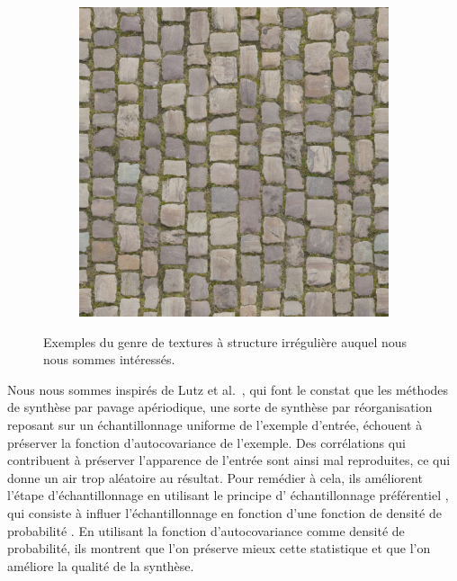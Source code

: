 \begin{figure}
\begin{subfigure}{.3\textwidth}
    \end{subfigure}
    \hfill
    \begin{subfigure}{.3\textwidth}
        \centering
        \includegraphics[width=\textwidth]{contenu/resources/images/texture_3}
    \end{subfigure}

    \caption{Exemples du genre de textures à structure irrégulière auquel nous nous sommes intéressés.}
    \label{fig:typical-textures}
\end{figure}


Nous nous sommes inspirés de Lutz et al.~\cite{lutz_preserving_2023}, qui font le constat que les méthodes de synthèse par pavage apériodique, une sorte de synthèse par réorganisation reposant sur un échantillonnage uniforme de l'exemple d'entrée, échouent à préserver la fonction d'autocovariance de l'exemple. Des corrélations qui contribuent à préserver l'apparence de l'entrée sont ainsi mal reproduites, ce qui donne un air trop aléatoire au résultat. Pour remédier à cela, ils améliorent l'étape d'échantillonnage en utilisant le principe d' \og échantillonnage préférentiel \fg{}, qui consiste à influer l'échantillonnage en fonction d'une \og fonction de densité de probabilité \fg{}. En utilisant la fonction d'autocovariance comme densité de probabilité, ils montrent que l'on préserve mieux cette statistique et que l'on améliore la qualité de la synthèse.

